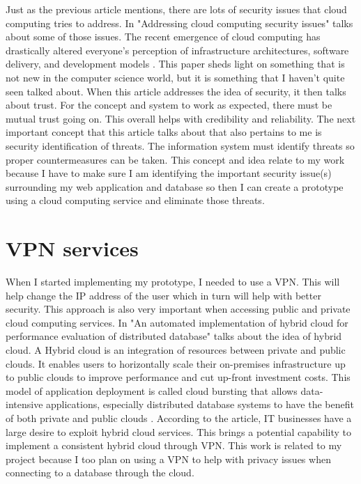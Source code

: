 Just as the previous article mentions, there are lots of security issues that cloud computing tries to address. In "Addressing cloud computing security issues" talks about some of those issues. The recent emergence of cloud computing has drastically altered everyone’s perception of infrastructure architectures, software delivery, and development models \cite{zissis2012addressing}.
This paper sheds light on something that is not new in the computer science world, but it is something that I haven't quite seen talked about. When this article addresses the idea of security, it then talks about trust. For the concept and system to work as expected, there must be mutual trust going on. This overall helps with credibility and reliability. The next important concept that this article talks about that also pertains to me is security identification of threats. The information system must identify threats so proper countermeasures can be taken. This concept and idea relate to my work because I have to make sure I am identifying the important security issue(s) surrounding my web application and database so then I can create a prototype using a cloud computing service and eliminate those threats.

\section{VPN services}
\label{sec:VPN services}
When I started implementing my prototype, I needed to use a VPN. This will help change the IP address of the user which in turn will help with better security. This approach is also very important when accessing public and private cloud computing services. In "An automated implementation of hybrid cloud for performance evaluation of distributed database" talks about the idea of hybrid cloud. A Hybrid cloud is an integration of resources between private and public clouds. It enables users to horizontally scale their on-premises infrastructure up to public clouds to improve performance and cut up-front investment costs. This model of application deployment is called cloud bursting that allows data-intensive applications, especially distributed database systems to have the benefit of both private and public clouds \cite{mansouri2020automated}.
According to the article, IT businesses have a large desire to exploit hybrid cloud services. This brings a potential capability to implement a consistent hybrid cloud through VPN. This work is related to my project because I too plan on using a VPN to help with privacy issues when connecting to a database through the cloud.


